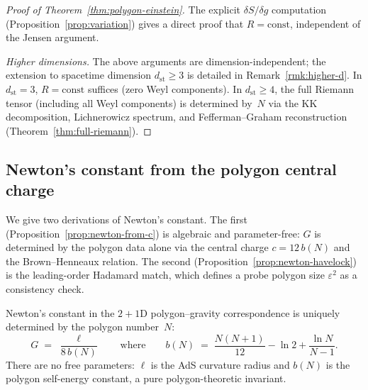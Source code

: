 \begin{proof}[Proof of Theorem~\ref{thm:polygon-einstein}]
The explicit $\delta S/\delta g$ computation
(Proposition~\ref{prop:variation}) gives a direct proof
that $R = \mathrm{const}$, independent of the Jensen argument.

\medskip
\noindent\emph{Higher dimensions.}
The above arguments are dimension-independent; the extension to
spacetime dimension $d_{\mathrm{st}} \ge 3$ is detailed in
Remark~\ref{rmk:higher-d}.
In $d_{\mathrm{st}} = 3$, $R = \mathrm{const}$ suffices
(zero Weyl components).
In $d_{\mathrm{st}} \ge 4$, the full Riemann tensor
(including all Weyl components) is determined by~$N$
via the KK decomposition, Lichnerowicz spectrum, and
Fefferman--Graham reconstruction
(Theorem~\ref{thm:full-riemann}).
\end{proof}

\subsection{Newton's constant from the polygon central charge}
\label{sec:newton-from-havelock}

We give two derivations of Newton's constant.  The first
(Proposition~\ref{prop:newton-from-c}) is algebraic and
parameter-free: $G$ is determined by the polygon data
alone via the central charge $c = 12\,b(N)$ and the
Brown--Henneaux relation.  The second
(Proposition~\ref{prop:newton-havelock}) is the
leading-order Hadamard match, which defines a probe
polygon size $\varepsilon^2$ as a consistency check.

\begin{proposition}
\label{prop:newton-from-c}
Newton's constant in the $2{+}1$D polygon--gravity
correspondence is uniquely determined by the polygon number~$N$:
\begin{equation}\label{eq:G-from-c}
  G \;=\; \frac{\ell}{8\,b(N)}
  \qquad\text{where}\qquad
  b(N) \;=\; \frac{N(N{+}1)}{12} - \ln 2 + \frac{\ln N}{N{-}1}.
\end{equation}
There are no free parameters: $\ell$ is the AdS curvature radius
and $b(N)$ is the polygon self-energy constant, a pure
polygon-theoretic invariant.
\end{proposition}

